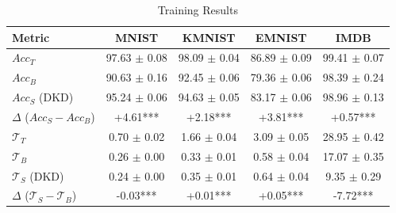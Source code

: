 \begin{table}
	\centering
	\caption{Training Results}
	\label{tab:combined-train-dkd}
	\begin{tabular}{lcccc}
		\hline
		Metric & MNIST & KMNIST & EMNIST & IMDB \\
		\hline
		$Acc_T$ & 97.63 $\pm$ 0.08 & 98.09 $\pm$ 0.04 & 86.89 $\pm$ 0.09 & 99.41 $\pm$ 0.07 \\
		$Acc_B$ & 90.63 $\pm$ 0.16 & 92.45 $\pm$ 0.06 & 79.36 $\pm$ 0.06 & 98.39 $\pm$ 0.24 \\
		$Acc_S$ (DKD) & 95.24 $\pm$ 0.06 & 94.63 $\pm$ 0.05 & 83.17 $\pm$ 0.06 & 98.96 $\pm$ 0.13 \\
		$\Delta$ ($Acc_S-Acc_B$) & +4.61*** & +2.18*** & +3.81*** & +0.57*** \\
		\hline
		$\mathcal{T}_T$ & 0.70 $\pm$ 0.02 & 1.66 $\pm$ 0.04 & 3.09 $\pm$ 0.05 & 28.95 $\pm$ 0.42 \\
		$\mathcal{T}_B$ & 0.26 $\pm$ 0.00 & 0.33 $\pm$ 0.01 & 0.58 $\pm$ 0.04 & 17.07 $\pm$ 0.35 \\
		$\mathcal{T}_S$ (DKD)& 0.24 $\pm$ 0.00 & 0.35 $\pm$ 0.01 & 0.64 $\pm$ 0.04 & 9.35 $\pm$ 0.29 \\
		$\Delta$ ($\mathcal{T}_S-\mathcal{T}_B$) & -0.03*** & +0.01*** & +0.05*** & -7.72*** \\
		\hline
	\end{tabular}
\end{table}
